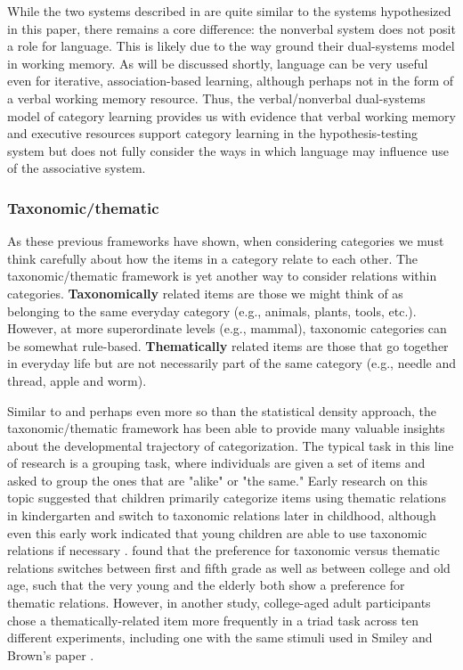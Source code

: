 \documentclass[../dissertation.tex]{subfiles}
\begin{document}
	While the two systems described in \citet{Minda2010} are quite similar to the systems hypothesized in this paper, there remains a core difference: the nonverbal system does not posit a role for language. This is likely due to the way \citet{Minda2010} ground their dual-systems model in working memory. As will be discussed shortly, language can be very useful even for iterative, association-based learning, although perhaps not in the form of a verbal working memory resource. Thus, the verbal/nonverbal dual-systems model of category learning provides us with evidence that verbal working memory and executive resources support category learning in the hypothesis-testing system but does not fully consider the ways in which language may influence use of the associative system. 
	
\subsubsection{Taxonomic/thematic}
	As these previous frameworks have shown, when considering categories we must think carefully about how the items in a category relate to each other. The taxonomic/thematic framework is yet another way to consider relations within categories. \textbf{Taxonomically} related items are those we might think of as belonging to the same everyday category (e.g., animals, plants, tools, etc.). However, at more superordinate levels (e.g., mammal), taxonomic categories can be somewhat rule-based. \textbf{Thematically} related items are those that go together in everyday life but are not necessarily part of the same category (e.g., needle and thread, apple and worm).  \par
	Similar to and perhaps even more so than the statistical density approach, the taxonomic/thematic framework has been able to provide many valuable insights about the developmental trajectory of categorization. The typical task in this line of research is a grouping task, where individuals are given a set of items and asked to group the ones that are "alike" or "the same." Early research on this topic suggested that children primarily categorize items using thematic relations in kindergarten and switch to taxonomic relations later in childhood, although even this early work indicated that young children are able to use taxonomic relations if necessary \citep{vygotsky1962language,piaget1964early}. \citet{Smiley1979} found that the preference for taxonomic versus thematic relations switches between first and fifth grade as well as between college and old age, such that the very young and the elderly both show a preference for thematic relations. However, in another study, college-aged adult participants chose a thematically-related item more frequently in a triad task across ten different experiments, including one with the same stimuli used in Smiley and Brown's paper \citep{Lin2001}. \par
\end{document}
